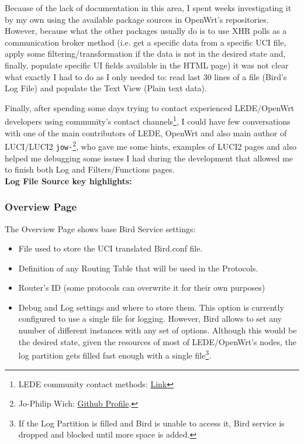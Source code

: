 Because of the lack of documentation in this area, I spent weeks investigating it by my own using the available package sources in OpenWrt's repositories. However, because what the other packages usually do is to use XHR polls as a communication broker method (i.e. get a specific data from a specific UCI file, apply some filtering/transformation if the data is not in the desired state and, finally, populate specific UI fields available in the HTML page) it was not clear what exactly I had to do as I only needed to: read last 30 lines of a file (Bird's Log File) and populate the Text View (Plain text data).

Finally, after spending some days trying to contact experienced LEDE/OpenWrt developers using community's contact channels\footnote{LEDE community contact methods: \href{https://lede-project.org/contact}{Link}}, I could have few conversations with one of the main contributors of LEDE, OpenWrt and also main author of LUCI/LUCI2 \texttt{jow-}\footnote{Jo-Philip Wich: \href{https://github.com/jow-}{Github Profile}.}, who gave me some hints, examples of LUCI2 pages and also helped me debugging some issues I had during the development that allowed me to finish both Log and Filters/Functions pages.\\

\textbf{Log File Source key highlights:}



\subsubsection{Overview Page}
The Overview Page shows base Bird Service settings:

\begin{itemize}
    \item File used to store the UCI translated Bird.conf file.
    \item Definition of any Routing Table that will be used in the Protocols.
    \item Router's ID (some protocols can overwrite it for their own purposes)
    \item Debug and Log settings and where to store them.
    This option is currently configured to use a single file for logging. However, Bird allows to set any number of different instances with any set of options. Although this would be the desired state, given the resources of most of LEDE/OpenWrt's nodes, the log partition gets filled fast enough with a single file\footnote{If the Log Partition is filled and Bird is unable to access it, Bird service is dropped and blocked until more space is added.}.
\end{itemize}

